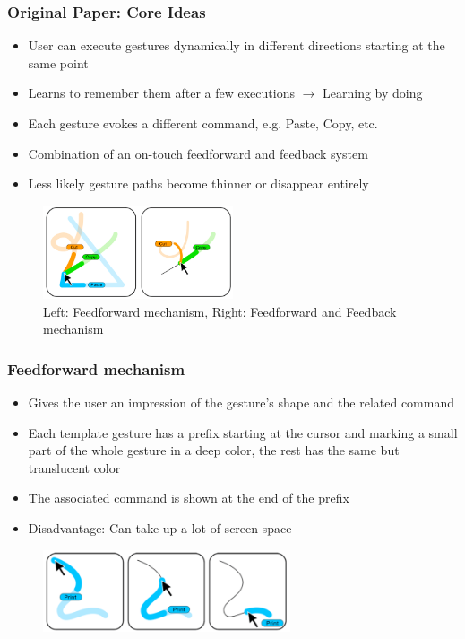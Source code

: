 \documentclass{beamer}
\begin{document}
\begin{frame}
\frametitle{Original Paper: Core Ideas}

\begin{itemize}
\item User can execute gestures dynamically in different directions starting at the same point
\item Learns to remember them after a few executions $\rightarrow$ \grqq Learning by doing\grqq
\item Each gesture evokes a different command, e.g. Paste, Copy, etc.
\item Combination of an on-touch feedforward and feedback system
\item Less likely gesture paths become thinner or disappear entirely
\end{itemize}


\begin{figure}[H]
\centering
\includegraphics[width=0.5\textwidth]{ffpaths12.png}
	\caption{Left: Feedforward mechanism, Right: Feedforward and Feedback mechanism}
\end{figure}


\end{frame}

\begin{frame}
\frametitle{Feedforward mechanism}

\begin{itemize}
\item Gives the user an impression of the gesture's shape and the related command
\item Each template gesture has a prefix starting at the cursor and marking a small part of the whole gesture in a deep color, the rest has the same but translucent color
\item The associated command is shown at the end of the prefix

\item Disadvantage: Can take up a lot of screen space
\end{itemize}

\begin{figure}[H]
\centering
\includegraphics[width=0.65\textwidth]{ff.png}
\end{figure}

\end{frame}
\end{document}
